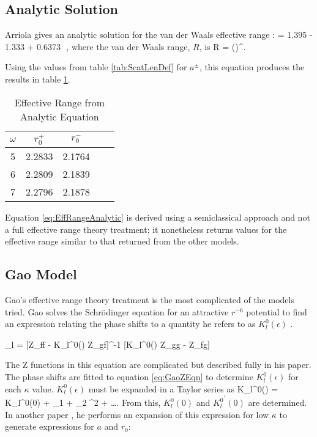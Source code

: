 \documentclass[Dissertation.tex]{subfiles}
\begin{document}
\subsection{Analytic Solution}
Arriola gives an analytic solution for the van der Waals effective range \cite{Arriola2010}:
\beq
\label{eq:EffRangeAnalytic}
 = 1.395 - 1.333  + 0.6373  \,\,,
\eeq
where the van der Waals range, $R$, is
\beq
R = \left(\right)^{}.
\eeq

\noindent Using the values from table \ref{tab:ScatLenDef} for $a^\pm$, this equation produces the results in table \ref{tab:EffRangeArriola}.

\begin{table}[H]
\begin{center}
\begin{tabular}{c c c c c}
\toprule
$\omega$ & $r_0^+$ & $r_0^-$ \\
\midrule
5 & 2.2833 & 2.1764 \\
6 & 2.2809 & 2.1839 \\
7 & 2.2796 & 2.1878 \\
\bottomrule
\end{tabular}
\caption{Effective Range from Analytic Equation}
\label{tab:EffRangeArriola}
\end{center}
\end{table}

Equation \ref{eq:EffRangeAnalytic} is derived using a semiclassical approach and not a full effective range theory treatment; it nonetheless returns values for the effective range similar to that returned from the other models.


\subsection{Gao Model}
Gao's effective range theory treatment is the most complicated of the models tried. Gao solves the Schr\"{o}dinger equation for an attractive $r^{-6}$ potential to find an expression relating the phase shifts to a quantity he refers to as $K_l^0(\epsilon)$ \cite{Gao1998}.

\beq
\label{eq:GaoZEqn}
\tan\delta_l = [Z_{ff} - K_l^0(\epsilon) Z_{gf}]^{-1} [K_l^0(\epsilon) Z_{gg} - Z_{fg}]
\eeq

\noindent The Z functions in this equation are complicated but described fully in his paper. The phase shifts are fitted to equation \ref{eq:GaoZEqn} to determine $K_l^0(\epsilon)$ for each $\kappa$ value. $K_l^0(\epsilon)$ must be expanded in a Taylor series as
\beq
\label{eq:GaoKTaylor}
K_l^0(\epsilon) = K_l^0(0) + \xi_1 \epsilon + \xi_2 \epsilon^2 + \ldots.
\eeq
From this, $K_l^0(0)$ and ${K_l^0}^\prime(0)$ are determined. In another paper \cite{Gao1998a}, he performs an expansion of this expression for low $\kappa$ to generate expressions for $a$ and $r_0$:
\end{document}
